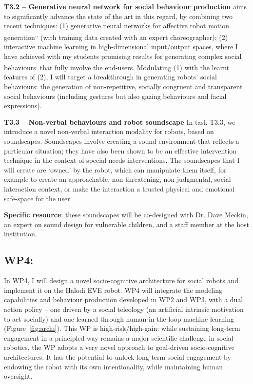 \textbf{T3.2 -- Generative neural network for social behaviour production}
\project aims to significantly advance the state of the art in this regard, by
combining two recent techniques: (1) generative neural networks for affective
robot motion
generation\textsuperscript{,}\textsuperscript{,}
(with training data created with an expert choreographer); (2) interactive
machine learning in high-dimensional input/output spaces, where I have achieved
with my students promising results for generating complex social
behaviours\textsuperscript{,}
that fully involve the end-users. Modulating (1)
with the learnt features of (2), I will target a breakthrough in generating robots' social
behaviours: the generation of non-repetitive, socially congruent and
transparent social behaviours (including gestures but also gazing behaviours and
facial expressions).

\textbf{T3.3 -- Non-verbal behaviours and robot soundscape} In task T3.3, we
introduce a novel non-verbal interaction modality for robots, based on
soundscapes. Soundscapes involve creating a sound environment that reflects a
particular situation; they have also been shown to be an effective intervention
technique in the context of special needs
interventions. The soundscapes that I will
create are `owned' by the robot, which can manipulate them itself, for example
to create an approachable, non-threatening, non-judgmental, social interaction
context, or make the interaction a trusted physical and emotional safe-space for
the user.

\textbf{Specific resource}: these soundscapes will be co-designed with Dr.
Dave Meckin, an expert on sound design for vulnerable children, and a staff
member at the host institution.

\subsection{WP4: \textbf{\wpFour}}

In WP4, I will design a novel socio-cognitive architecture for social
robots and implement it on the Halodi EVE robot. WP4 will integrate the
modeling capabilities and behaviour production developed in WP2 and WP3, with a
dual action policy -- one driven by a social teleology (an artificial
intrinsic motivation to act socially) and one learned through
human-in-the-loop machine learning (Figure~\ref{fig:archi}). This WP is high-risk/high-gain: while sustaining
long-term engagement in a principled way remains a major scientific
challenge in social robotics, the WP adopts a very novel
approach to goal-driven socio-cognitive architectures. It has the potential to
unlock long-term social engagement by endowing the robot with its own
intentionality, while maintaining human oversight.


